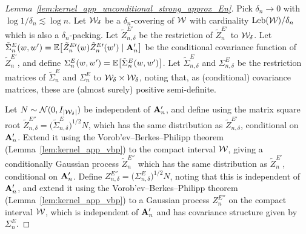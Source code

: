 \begin{proof}[Lemma~\ref{lem:kernel_app_unconditional_strong_approx_En}]


  Pick $\delta_n \to 0$
  with $\log 1/\delta_n \lesssim \log n$.
  Let $\mathcal{W}_\delta$ be a $\delta_n$-covering of $\mathcal{W}$
  with cardinality $\operatorname{Leb}(\mathcal{W})/\delta_n$
  which is also a $\delta_n$-packing.
  Let $\tilde Z_{n,\delta}^{E\prime}$
  be the restriction of $\tilde Z_n^{E\prime}$
  to $\mathcal{W}_\delta$.
  Let
  $\tilde \Sigma_n^E(w, w') =
  \mathbb{E}\big[\tilde Z_n^{E\prime}(w) \tilde Z_n^{E\prime}(w')
  \mid \mathbf{A}_n' \big]$
  be the conditional covariance function of $\tilde Z_n^{E\prime}$,
  and define
  $\Sigma_n^E(w,w') = \mathbb{E}\big[\tilde \Sigma_n^E(w,w')\big]$.
  Let $\tilde \Sigma^E_{n,\delta}$ and $\Sigma^E_{n,\delta}$
  be the restriction matrices of
  $\tilde \Sigma^E_n$ and $\Sigma^E_n$
  to $\mathcal{W}_\delta \times \mathcal{W}_\delta$,
  noting that, as (conditional) covariance matrices,
  these are
  (almost surely)
  positive semi-definite.

  Let $N \sim \mathcal{N}(0, I_{|\mathcal{W}_\delta|})$
  be independent of $\mathbf{A}_n'$,
  and define using the matrix square root
  $\tilde Z_{n,\delta}^{E\dprime}
  = \big(\tilde \Sigma^E_{n,\delta})^{1/2} N$,
  which has the same distribution as
  $\tilde Z_{n,\delta}^{E\prime}$,
  conditional on $\mathbf{A}_n'$.
  Extend it using
  the Vorob'ev--Berkes--Philipp theorem
  (Lemma~\ref{lem:kernel_app_vbp})
  to the compact interval $\mathcal{W}$,
  giving a conditionally Gaussian process
  $\tilde Z_n^{E\dprime}$
  which has the same distribution as
  $\tilde Z_{n}^{E\prime}$,
  conditional on $\mathbf{A}_n'$.
  Define
  $Z_{n,\delta}^{E\dprime} = \big(\Sigma^E_{n,\delta})^{1/2} N$,
  noting that this is independent of $\mathbf{A}_n'$,
  and extend it using
  the Vorob'ev--Berkes--Philipp theorem
  (Lemma~\ref{lem:kernel_app_vbp})
  to a Gaussian process
  $Z_n^{E\dprime}$ on the compact interval $\mathcal{W}$,
  which is independent of $\mathbf{A}_n'$
  and has covariance structure given by
  $\Sigma_n^E$.



\end{proof}
